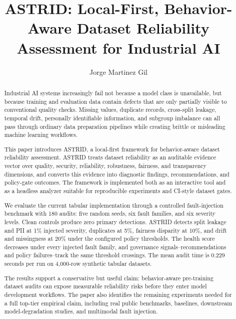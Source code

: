 \documentclass[runningheads]{llncs}
\title{ASTRID: Local-First, Behavior-Aware Dataset Reliability Assessment for Industrial AI}
\author{Jorge Martinez Gil}
\institute{Affiliation to be added}
\begin{document}
\maketitle

\begin{abstract}
Industrial AI systems increasingly fail not because a model class is unavailable,
but because training and evaluation data contain defects that are only partially
visible to conventional quality checks. Missing values, duplicate records,
cross-split leakage, temporal drift, personally identifiable information, and
subgroup imbalance can all pass through ordinary data preparation pipelines while
creating brittle or misleading machine learning workflows.

This paper introduces ASTRID, a local-first framework for behavior-aware dataset
reliability assessment. ASTRID treats dataset reliability as an auditable evidence
vector over quality, security, reliability, robustness, fairness, and transparency
dimensions, and converts this evidence into diagnostic findings, recommendations,
and policy-gate outcomes. The framework is implemented both as an interactive
tool and as a headless analyzer suitable for reproducible experiments and CI-style
dataset gates.

We evaluate the current tabular implementation through a controlled fault-injection
benchmark with 180 audits: five random seeds, six fault families, and six severity
levels. Clean controls produce zero primary detections. ASTRID detects split
leakage and PII at 1\% injected severity, duplicates at 5\%, fairness disparity at
10\%, and drift and missingness at 20\% under the configured policy thresholds.
The health score decreases under every injected fault family, and governance
signals--recommendations and policy failures--track the same threshold crossings.
The mean audit time is 0.229 seconds per run on 4,000-row synthetic tabular
datasets.

The results support a conservative but useful claim: behavior-aware pre-training
dataset audits can expose measurable reliability risks before they enter model
development workflows. The paper also identifies the remaining experiments needed
for a full top-tier empirical claim, including real public benchmarks, baselines,
downstream model-degradation studies, and multimodal fault injection.
\end{abstract}
\end{document}
